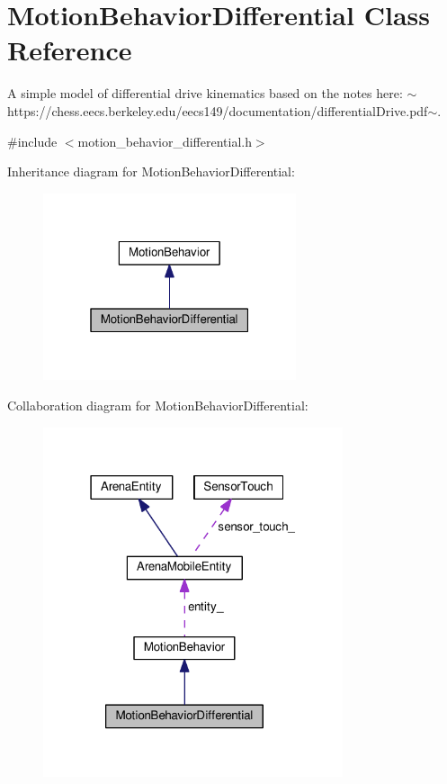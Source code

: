 \hypertarget{classMotionBehaviorDifferential}{}\section{Motion\+Behavior\+Differential Class Reference}
\label{classMotionBehaviorDifferential}


A simple model of differential drive kinematics based on the notes here\+: $\sim$https\+://chess.eecs.\+berkeley.\+edu/eecs149/documentation/differential\+Drive.pdf$\sim$.  




{\ttfamily \#include $<$motion\+\_\+behavior\+\_\+differential.\+h$>$}



Inheritance diagram for Motion\+Behavior\+Differential\+:\nopagebreak
\begin{figure}[H]
\begin{center}
\leavevmode
\includegraphics[width=211pt]{classMotionBehaviorDifferential__inherit__graph}
\end{center}
\end{figure}


Collaboration diagram for Motion\+Behavior\+Differential\+:\nopagebreak
\begin{figure}[H]
\begin{center}
\leavevmode
\includegraphics[width=250pt]{classMotionBehaviorDifferential__coll__graph}
\end{center}
\end{figure}

